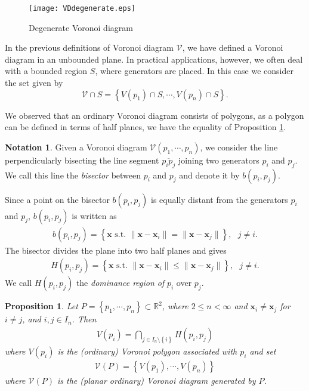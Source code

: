 \documentclass[a4paper,12pt]{article}
\newtheorem{prop}[thm]{Proposition}
\newtheorem*{Condition 1}{Condition 1}
\newtheorem*{Condition 2}{Condition 2}
\theoremstyle{definition}
\newtheorem{notation}[thm]{Notation}
\theoremstyle{remark}
\begin{document}
\begin{figure}[htbp]
\centering
{\texttt{[image: VDdegenerate.eps]}}
    \caption{Degenerate Voronoi diagram}
\end{figure}



In the previous definitions of Voronoi diagram $\mathcal{V}$, we have defined a Voronoi diagram in an unbounded plane. In practical applications, however, we often deal with a bounded region $S$, where generators are placed. In this case we consider the set given by
$$\mathcal{V}\cap S=\left\lbrace V(p_1)\cap S,\cdots ,V(p_n)\cap S\right\rbrace .$$



We observed that an ordinary Voronoi diagram consists of polygons, as a polygon can be defined in terms of half planes, we have the  equality of Proposition \ref{perpendicular2}. 

\begin{notation}
Given a Voronoi diagram $\mathcal{V}(p_1, \cdots , p_n)$, we consider the line perpendicularly bisecting the line segment $\overline{p_i p_j}$ joining two generators $p_i$ and $p_j$. We call this line the \emph{bisector} between $p_i$ and $p_j$ and denote it by $b(p_i,p_j)$. 

Since a point on the bisector $b(p_i,p_j)$ is equally distant from the generators $p_i$ and $p_j$, $b(p_i,p_j)$ is written as
\begin{align*}
 b(p_i,p_j)=\left\lbrace \textbf{x}\mbox{~s.t.~} \parallel
\textbf{x}-\textbf{x}_i\parallel=\parallel\textbf{x}-\textbf{x}_j\parallel\right\rbrace,\mbox{~~} j\neq i.
\end{align*}
The bisector divides the plane into two half planes and gives
\begin{align*}
H(p_i,p_j)=\left\lbrace \textbf{x}\mbox{~s.t.~} \parallel \textbf{x}-\textbf{x}_i\parallel\leq\parallel\textbf{x}-\textbf{x}_j\parallel\right\rbrace,\mbox{~~} j\neq i.
\end{align*}
We call $H(p_i,p_j)$ the \emph{dominance region of} $p_i$ over $p_j$.
\end{notation}

\begin{prop}\label{perpendicular2}
Let $P=\left\lbrace p_1,\cdots , p_n\right\rbrace \subset \mathbb{R}^2$, where $2\leq n<\infty$ and $\textbf{x}_i\neq \textbf{x}_j$ for $i\neq j$, and $i,j\in I_n$. Then
\begin{align*}
 V(p_i)=\bigcap_{j\in I_n\setminus\left\lbrace i\right\rbrace } H(p_i,p_j)
\end{align*}
where $V(p_i)$ is the \emph{(ordinary) Voronoi polygon} associated with $p_i$ and set
\begin{align*}
 \mathcal{V}(P)=\left\lbrace V(p_1), \cdots , V(p_n)\right\rbrace 
\end{align*}
where $\mathcal{V}(P)$ is the \emph{(planar ordinary) Voronoi diagram} generated by $P$.

\end{prop}
\end{document}
